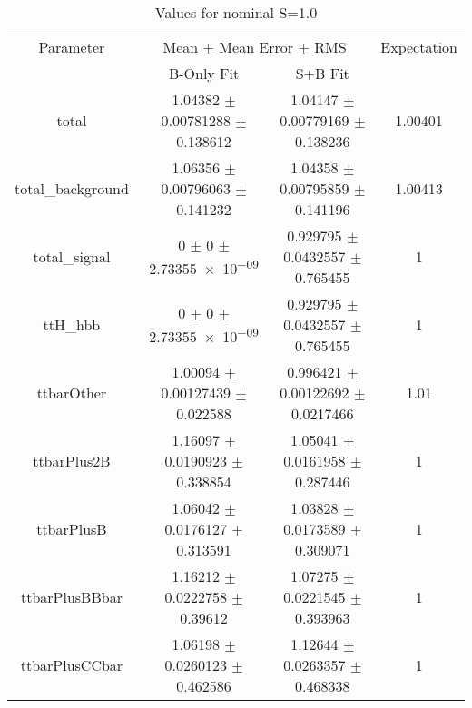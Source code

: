 \begin{table}
\centering
\caption{Values for nominal S=1.0}
\begin{tabular}{cccc}
\toprule
Parameter & \multicolumn{2}{c}{Mean $\pm$ Mean Error $\pm$ RMS} & Expectation\\
 & B-Only Fit & S+B Fit & \\
\midrule
total & \num{1.04382} $\pm$ \num{0.00781288} $\pm$ \num{0.138612} & \num{1.04147} $\pm$ \num{0.00779169} $\pm$ \num{0.138236} & \num{1.00401}\\
total\_background & \num{1.06356} $\pm$ \num{0.00796063} $\pm$ \num{0.141232} & \num{1.04358} $\pm$ \num{0.00795859} $\pm$ \num{0.141196} & \num{1.00413}\\
total\_signal & \num{0} $\pm$ \num{0} $\pm$ \num{2.73355e-09} & \num{0.929795} $\pm$ \num{0.0432557} $\pm$ \num{0.765455} & \num{1}\\
ttH\_hbb & \num{0} $\pm$ \num{0} $\pm$ \num{2.73355e-09} & \num{0.929795} $\pm$ \num{0.0432557} $\pm$ \num{0.765455} & \num{1}\\
ttbarOther & \num{1.00094} $\pm$ \num{0.00127439} $\pm$ \num{0.022588} & \num{0.996421} $\pm$ \num{0.00122692} $\pm$ \num{0.0217466} & \num{1.01}\\
ttbarPlus2B & \num{1.16097} $\pm$ \num{0.0190923} $\pm$ \num{0.338854} & \num{1.05041} $\pm$ \num{0.0161958} $\pm$ \num{0.287446} & \num{1}\\
ttbarPlusB & \num{1.06042} $\pm$ \num{0.0176127} $\pm$ \num{0.313591} & \num{1.03828} $\pm$ \num{0.0173589} $\pm$ \num{0.309071} & \num{1}\\
ttbarPlusBBbar & \num{1.16212} $\pm$ \num{0.0222758} $\pm$ \num{0.39612} & \num{1.07275} $\pm$ \num{0.0221545} $\pm$ \num{0.393963} & \num{1}\\
ttbarPlusCCbar & \num{1.06198} $\pm$ \num{0.0260123} $\pm$ \num{0.462586} & \num{1.12644} $\pm$ \num{0.0263357} $\pm$ \num{0.468338} & \num{1}\\
\bottomrule
\end{tabular}
\end{table}